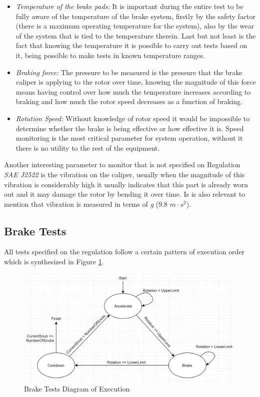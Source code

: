 			\begin{itemize}
				\item \textit{Temperature of the brake pads:} It is important during the entire test to be fully aware of the temperature of the brake system, firstly by the safety factor (there is a maximum operating temperature for the system), also by the wear of the system that is tied to the temperature therein. Last but not least is the fact that knowing the temperature it is possible to carry out tests based on it, being possible to make tests in known temperature ranges.\label{itm:monitored-temperature}
				\item \textit{Braking force:} The pressure to be measured is the pressure that the brake caliper is applying to the rotor over time, knowing the magnitude of this force means having control over how much the temperature increases according to braking and how much the rotor speed decreases as a function of braking.\label{itm:monitored-pressure}
				\item \textit{Rotation Speed:} Without knowledge of rotor speed it would be impossible to determine whether the brake is being effective or how effective it is. Speed monitoring is the most critical parameter for system operation, without it there is no utility to the rest of the equipment. \label{itm:monitored-speed}
			\end{itemize}

			Another interesting parameter to monitor that is not specified on Regulation \textit{SAE J2522} is the vibration on the caliper, usually when the magnitude of this vibration is considerably high it usually indicates that this part is already worn out \cite{goodyear-calipers} and it may damage the rotor by bending it over time. Is is also relevant to mention that vibration is measured in terms of \textit{g} (9.8 $m\cdot s^2$).

		\subsection{Brake Tests}\label{ssec:brake-tests}
			All tests specified on the regulation follow a certain pattern of execution order which is synthesized in Figure \ref{fig:brake-test-diagram}.

			\begin{figure}[htbp]
				\centering
				\includegraphics[width=.8\textwidth]{figuras/fig-brake-test-diagram}
				\caption{Brake Tests Diagram of Execution}
				\label{fig:brake-test-diagram}
			\end{figure}


